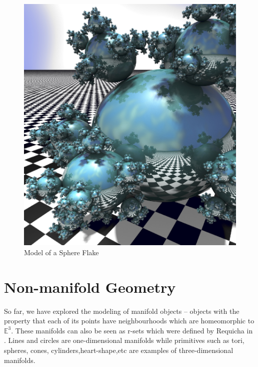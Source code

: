 \begin{figure}[htbp]
\centering
\includegraphics[trim=0.0cm 0.5cm 0.1cm 0.1cm, clip=true, totalheight=0.5\textheight]{Pictures/Sphere.png}
\caption[Model of a Sphere Flake]{Model of a Sphere Flake}
\label{Sphere}
\end{figure}

\clearpage

\section{Non-manifold Geometry}

\hspace{30} So   far,   we   have   explored   the   modeling   of   manifold   objects – objects   with  
the   property   that   each   of   its   points   have   neighbourhoods   which   are  
homeomorphic   to   $\mathbb{E}^3$.   These   manifolds   can  also   be   seen   as   
r-­sets   which   were   defined   by   Requicha   in   \cite{5}.   Lines   and   circles  are   
one-­dimensional   manifolds   while   primitives   such   as   tori,   spheres,   cones, 
cylinders,heart­-shape,etc are examples of three­-dimensional manifolds.

